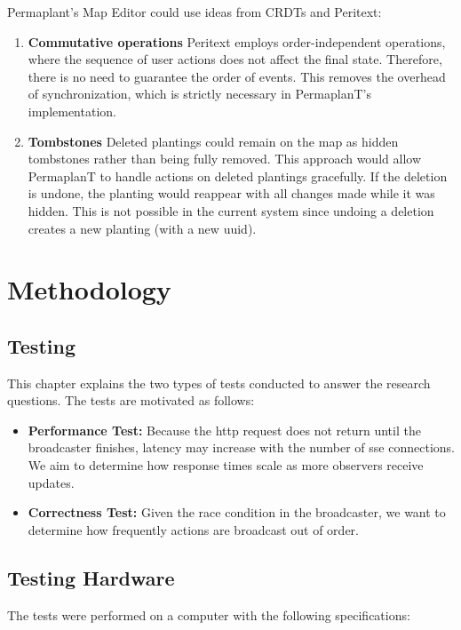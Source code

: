 \documentclass[final,oneside]{vutinfth}
\begin{document}
Permaplant's Map Editor could use ideas from CRDTs and Peritext:
\begin{enumerate}
    \item \textbf{Commutative operations} Peritext employs order-independent operations, where the sequence of user actions does not affect the final state.
    Therefore, there is no need to guarantee the order of events.
    This removes the overhead of synchronization, which is strictly necessary in PermaplanT's implementation.
    \item \textbf{Tombstones} Deleted plantings could remain on the map as hidden tombstones rather than being fully removed.
    This approach would allow PermaplanT to handle actions on deleted plantings gracefully.
    If the deletion is undone, the planting would reappear with all changes made while it was hidden.
    This is not possible in the current system since undoing a deletion creates a new planting (with a new \gls{uuid}).
\end{enumerate}

\chapter{Methodology}\label{chap:methodology}

\section{Testing}

This chapter explains the two types of tests conducted to answer the research questions.
The tests are motivated as follows:
\begin{itemize}
    \item \textbf{Performance Test:} Because the \gls{http} request does not return until the broadcaster finishes, latency may increase with the number of \gls{sse} connections.
    We aim to determine how response times scale as more observers receive updates.
    \item \textbf{Correctness Test:} Given the race condition in the broadcaster, we want to determine how frequently actions are broadcast out of order.
\end{itemize}

\section{Testing Hardware}

The tests were performed on a computer with the following specifications:
\end{document}
